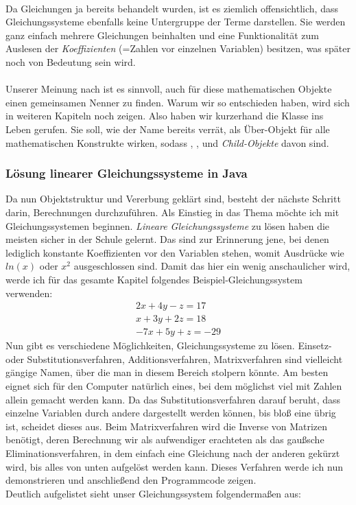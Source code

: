 \\
Da Gleichungen ja bereits behandelt wurden, ist es ziemlich offensichtlich, dass Gleichungssysteme ebenfalls keine Untergruppe der Terme darstellen. Sie werden ganz einfach mehrere Gleichungen beinhalten und eine Funktionalität zum Auslesen der \textit{Koeffizienten} (=Zahlen vor einzelnen Variablen) besitzen, was später noch von Bedeutung sein wird.\\
\\
Unserer Meinung nach ist es sinnvoll, auch für diese mathematischen Objekte einen gemeinsamen Nenner zu finden. Warum wir so entschieden haben, wird sich in weiteren Kapiteln noch zeigen. Also haben wir kurzerhand die Klasse  ins Leben gerufen. Sie soll, wie der Name bereits verrät, als Über-Objekt für alle mathematischen Konstrukte wirken, sodass , ,  und  \textit{Child-Objekte} davon sind.

\subsubsection{Lösung linearer Gleichungssysteme in Java}
Da nun Objektstruktur und Vererbung geklärt sind, besteht der nächste Schritt darin, Berechnungen durchzuführen. Als Einstieg in das Thema möchte ich mit Gleichungssystemen beginnen. \textit{Lineare Gleichungssysteme} zu lösen haben die meisten sicher in der Schule gelernt. Das sind zur Erinnerung jene, bei denen lediglich konstante Koeffizienten vor den Variablen stehen, womit Ausdrücke wie $ln(x)$ oder $x^2$ ausgeschlossen sind. Damit das hier ein wenig anschaulicher wird, werde ich für das gesamte Kapitel folgendes Beispiel-Gleichungssystem verwenden:
\begin{gather*}
2x + 4y - z = 17\\
x + 3y + 2z = 18\\
-7x + 5y + z = -29
\end{gather*}
\noindent
Nun gibt es verschiedene Möglichkeiten, Gleichungssysteme zu lösen. Einsetz- oder Substitutionsverfahren, Additionsverfahren, Matrixverfahren sind vielleicht gängige Namen, über die man in diesem Bereich stolpern könnte. Am besten eignet sich für den Computer natürlich eines, bei dem möglichst viel mit Zahlen allein gemacht werden kann. Da das Substitutionsverfahren darauf beruht, dass einzelne Variablen durch andere dargestellt werden können, bis bloß eine übrig ist, scheidet dieses aus. Beim Matrixverfahren wird die Inverse von Matrizen benötigt, deren Berechnung wir als aufwendiger erachteten als das gaußsche Eliminationsverfahren, in dem einfach eine Gleichung nach der anderen gekürzt wird, bis alles von unten aufgelöst werden kann. Dieses Verfahren werde ich nun demonstrieren und anschließend den Programmcode zeigen.\\
Deutlich aufgelistet sieht unser Gleichungssystem folgendermaßen aus:

